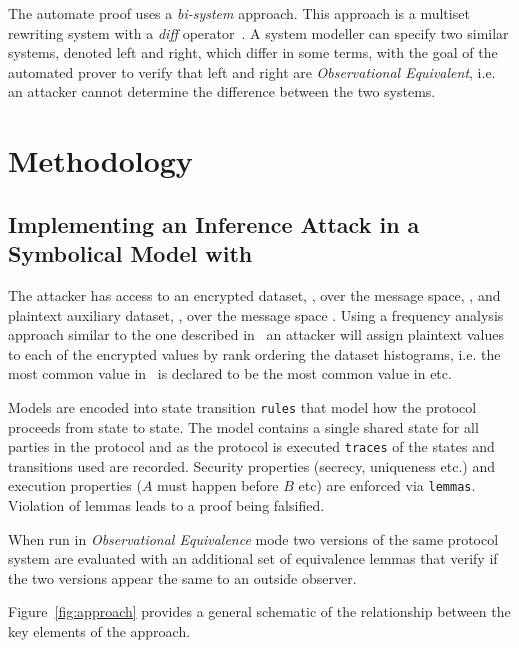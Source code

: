 \documentclass[runningheads]{llncs}
\begin{document}
The automate proof uses a \textit{bi-system} approach. This approach is a multiset rewriting system with a \textit{diff} operator~\cite{AutomatedObsEqv18}.  A system modeller can specify two similar systems, denoted left and right, which differ in some terms, with the goal of the automated prover to verify that left and right are \textit{Observational Equivalent}, i.e. an attacker cannot determine the difference between the two systems.

\section{Methodology}
\subsection{Implementing an Inference Attack in a Symbolical Model with \tamarin{}}
The attacker has access to an encrypted dataset, \enc{}, over the message space, \encSpace{}, and plaintext auxiliary dataset, \aux{}, over the message space \auxSpace. Using a frequency analysis approach similar to the one described in~\cite{InfrenceAttacks} an attacker will assign plaintext values to each of the encrypted values by rank ordering the dataset histograms, i.e. the most common value in \enc{}\ is declared to be the most common value in \aux{} etc.

Models are encoded into state transition \texttt{rules} that model how the protocol proceeds from state to state. The model contains a single shared state for all parties in the protocol and as the protocol is executed \texttt{traces} of the states and transitions used are recorded. Security properties (secrecy, uniqueness etc.) and execution properties ($A$ must happen before $B$ etc) are enforced via \texttt{lemmas}. Violation of lemmas leads to a proof being falsified.

When run in \textit{Observational Equivalence} mode two versions of the same protocol system are evaluated with an additional set of equivalence lemmas that verify if the two versions appear the same to an outside observer.

Figure~\ref{fig:approach} provides a general schematic of the relationship between the key elements of the approach.
\end{document}
